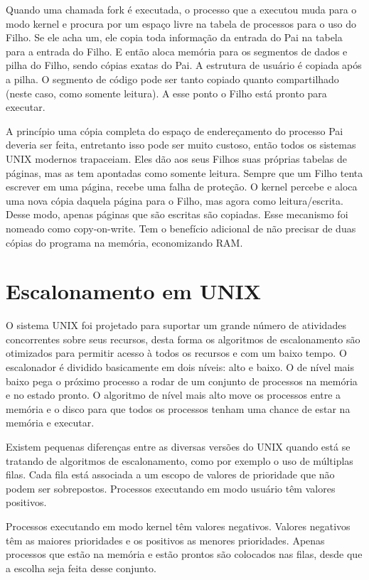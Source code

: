 Quando uma chamada fork é executada, o processo que a executou muda para o modo kernel e procura por um espaço livre na tabela de processos para o uso do Filho. Se ele acha um, ele copia toda informação da entrada do Pai na tabela para a entrada do Filho. E então aloca memória para os segmentos de dados e pilha do Filho, sendo cópias exatas do Pai. A estrutura de usuário é copiada após a pilha. O segmento de código pode ser tanto copiado quanto compartilhado (neste caso, como somente leitura). A esse ponto o Filho está pronto para executar.

A princípio uma cópia completa do espaço de endereçamento do processo Pai deveria ser feita, entretanto isso pode ser muito custoso, então todos os sistemas UNIX modernos trapaceiam. Eles dão aos seus Filhos suas próprias tabelas de páginas, mas as tem apontadas como somente leitura. Sempre que um Filho tenta escrever em uma página, recebe uma falha de proteção. O kernel percebe e aloca uma nova cópia daquela página para o Filho, mas agora como leitura/escrita. Desse modo, apenas páginas que são escritas são copiadas. Esse mecanismo foi nomeado como copy-on-write. Tem o benefício adicional de não precisar de duas cópias do programa na memória, economizando RAM.

\section{Escalonamento em UNIX}

O sistema UNIX foi projetado para suportar um grande número de atividades concorrentes sobre seus recursos, desta forma os algoritmos de escalonamento são otimizados para permitir acesso à todos os recursos e com um baixo tempo. O escalonador é dividido basicamente em dois níveis: alto e baixo. O de nível mais baixo pega o próximo processo a rodar de um conjunto de processos na memória e no estado pronto. O algoritmo de nível mais alto move os processos entre a memória e o disco para que todos os processos tenham uma chance de estar na memória e executar.

Existem pequenas diferenças entre as diversas versões do UNIX quando está se tratando de algoritmos de escalonamento, como por exemplo o uso de múltiplas filas. Cada fila está associada a um escopo de valores de prioridade que não podem ser sobrepostos. Processos executando em modo usuário têm valores positivos.

Processos executando em modo kernel têm valores negativos. Valores negativos têm as maiores prioridades e os positivos as menores prioridades. Apenas processos que estão na memória e estão prontos são colocados nas filas, desde que a escolha seja feita desse conjunto.

